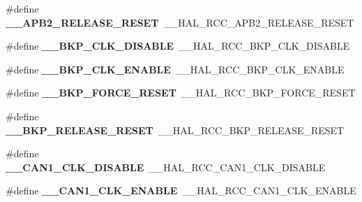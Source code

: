 \begin{DoxyCompactItemize}
\item 
\#define {\bfseries \+\_\+\+\_\+\+A\+P\+B2\+\_\+\+R\+E\+L\+E\+A\+S\+E\+\_\+\+R\+E\+S\+ET}~\+\_\+\+\_\+\+H\+A\+L\+\_\+\+R\+C\+C\+\_\+\+A\+P\+B2\+\_\+\+R\+E\+L\+E\+A\+S\+E\+\_\+\+R\+E\+S\+ET\hypertarget{group___h_a_l___r_c_c___aliased_ga68340225a9f3449d73f454972cf01726}{}\label{group___h_a_l___r_c_c___aliased_ga68340225a9f3449d73f454972cf01726}

\item 
\#define {\bfseries \+\_\+\+\_\+\+B\+K\+P\+\_\+\+C\+L\+K\+\_\+\+D\+I\+S\+A\+B\+LE}~\+\_\+\+\_\+\+H\+A\+L\+\_\+\+R\+C\+C\+\_\+\+B\+K\+P\+\_\+\+C\+L\+K\+\_\+\+D\+I\+S\+A\+B\+LE\hypertarget{group___h_a_l___r_c_c___aliased_ga266ad5c1a161c961123d8f3d6db2fc69}{}\label{group___h_a_l___r_c_c___aliased_ga266ad5c1a161c961123d8f3d6db2fc69}

\item 
\#define {\bfseries \+\_\+\+\_\+\+B\+K\+P\+\_\+\+C\+L\+K\+\_\+\+E\+N\+A\+B\+LE}~\+\_\+\+\_\+\+H\+A\+L\+\_\+\+R\+C\+C\+\_\+\+B\+K\+P\+\_\+\+C\+L\+K\+\_\+\+E\+N\+A\+B\+LE\hypertarget{group___h_a_l___r_c_c___aliased_ga04daaca6a8e6c062dfc6dc3e50341b26}{}\label{group___h_a_l___r_c_c___aliased_ga04daaca6a8e6c062dfc6dc3e50341b26}

\item 
\#define {\bfseries \+\_\+\+\_\+\+B\+K\+P\+\_\+\+F\+O\+R\+C\+E\+\_\+\+R\+E\+S\+ET}~\+\_\+\+\_\+\+H\+A\+L\+\_\+\+R\+C\+C\+\_\+\+B\+K\+P\+\_\+\+F\+O\+R\+C\+E\+\_\+\+R\+E\+S\+ET\hypertarget{group___h_a_l___r_c_c___aliased_ga91a4e9e2dcb7942be268a76e233c4bf2}{}\label{group___h_a_l___r_c_c___aliased_ga91a4e9e2dcb7942be268a76e233c4bf2}

\item 
\#define {\bfseries \+\_\+\+\_\+\+B\+K\+P\+\_\+\+R\+E\+L\+E\+A\+S\+E\+\_\+\+R\+E\+S\+ET}~\+\_\+\+\_\+\+H\+A\+L\+\_\+\+R\+C\+C\+\_\+\+B\+K\+P\+\_\+\+R\+E\+L\+E\+A\+S\+E\+\_\+\+R\+E\+S\+ET\hypertarget{group___h_a_l___r_c_c___aliased_ga3b4efa57000a06d76a4c40feff772416}{}\label{group___h_a_l___r_c_c___aliased_ga3b4efa57000a06d76a4c40feff772416}

\item 
\#define {\bfseries \+\_\+\+\_\+\+C\+A\+N1\+\_\+\+C\+L\+K\+\_\+\+D\+I\+S\+A\+B\+LE}~\+\_\+\+\_\+\+H\+A\+L\+\_\+\+R\+C\+C\+\_\+\+C\+A\+N1\+\_\+\+C\+L\+K\+\_\+\+D\+I\+S\+A\+B\+LE\hypertarget{group___h_a_l___r_c_c___aliased_ga069d17c79a340a1635b26ddd76b677f0}{}\label{group___h_a_l___r_c_c___aliased_ga069d17c79a340a1635b26ddd76b677f0}

\item 
\#define {\bfseries \+\_\+\+\_\+\+C\+A\+N1\+\_\+\+C\+L\+K\+\_\+\+E\+N\+A\+B\+LE}~\+\_\+\+\_\+\+H\+A\+L\+\_\+\+R\+C\+C\+\_\+\+C\+A\+N1\+\_\+\+C\+L\+K\+\_\+\+E\+N\+A\+B\+LE\hypertarget{group___h_a_l___r_c_c___aliased_ga87260dd9425f0d8224e8422f73288e20}{}\label{group___h_a_l___r_c_c___aliased_ga87260dd9425f0d8224e8422f73288e20}


\end{DoxyCompactItemize}
